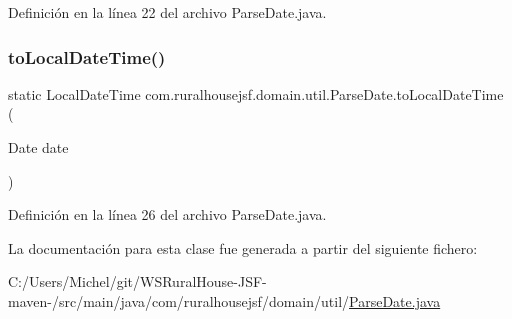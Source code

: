Definición en la línea 22 del archivo Parse\+Date.\+java.

\mbox{\label{classcom_1_1ruralhousejsf_1_1domain_1_1util_1_1_parse_date_aacf06ccd03aba32238d32068f0fe1ca2}} 
\subsubsection{\texorpdfstring{toLocalDateTime()}{toLocalDateTime()}}
{\footnotesize\ttfamily static Local\+Date\+Time com.\+ruralhousejsf.\+domain.\+util.\+Parse\+Date.\+to\+Local\+Date\+Time (\begin{DoxyParamCaption}\item[{Date}]{date }\end{DoxyParamCaption})\hspace{0.3cm}{\ttfamily [static]}}



Definición en la línea 26 del archivo Parse\+Date.\+java.



La documentación para esta clase fue generada a partir del siguiente fichero\+:\begin{DoxyCompactItemize}
\item 
C\+:/\+Users/\+Michel/git/\+W\+S\+Rural\+House-\/\+J\+S\+F-\/maven-\//src/main/java/com/ruralhousejsf/domain/util/\mbox{\hyperlink{_parse_date_8java}{Parse\+Date.\+java}}\end{DoxyCompactItemize}
